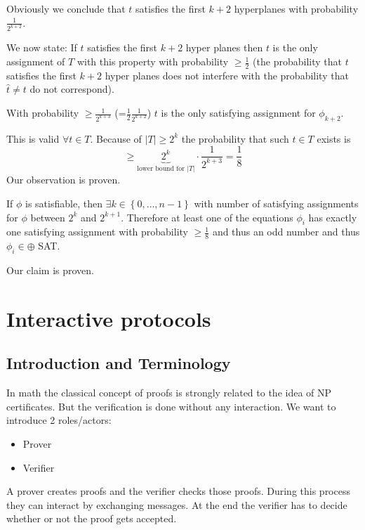 \documentclass[a4paper]{article}
\newcommand{\cls}[1]{\rm{#1}}
\newcommand{\set}[1]{\left\{#1\right\}}
\begin{document}
\begin{itemize}
    Obviously we conclude that $t$ satisfies the first
    $k+2$ hyperplanes with probability $\frac1{2^{k+2}}$.

    We now state:
    If $t$ satisfies the first $k+2$ hyper planes then $t$
    is the only assignment of $T$ with this property with
    probability $\geq \frac12$ (the probability that $t$
    satisfies the first $k+2$ hyper planes does not interfere
    with the probability that $\hat{t} \neq t$ do not correspond).

    With probability $\geq \frac{1}{2^{k+3}}$
    (=$\frac12 \frac{1}{2^{k+2}}$) $t$ is the only
    satisfying assignment for $\phi_{k+2}$.

    This is valid $\forall t \in T$. Because of $|T| \geq 2^k$
    the probability that such $t \in T$ exists is
    \[
      \geq \underbrace{2^k}_{\text{lower bound for }|T|} \cdot
        \frac{1}{2^{k+3}}
      = \frac18
    \]
    Our observation is proven.

    If $\phi$ is satisfiable, then $\exists k \in \set{0, \ldots,
    n-1}$ with number of satisfying assignments for $\phi$ between
    $2^k$ and $2^{k+1}$. Therefore at least one of the equations
    $\phi_i$ has exactly one satisfying assignment with
    probability $\geq \frac18$ and thus an odd number and thus
    $\phi_i \in \oplus$ SAT.

    Our claim is proven.
\end{itemize}

\section{Interactive protocols}
%
\subsection{Introduction and Terminology}
%
In math the classical concept of proofs is strongly related to
the idea of \cls{NP} certificates. But the verification is done without
any interaction. We want to introduce 2 roles/actors:
\begin{itemize}
  \item Prover
  \item Verifier
\end{itemize}

A prover creates proofs and the verifier checks those proofs.
During this process they can interact by exchanging messages.
At the end the verifier has to decide whether or not the proof
gets accepted.
\end{document}
